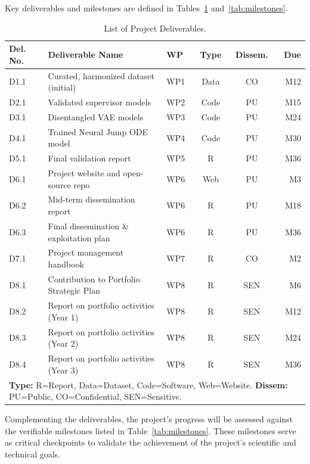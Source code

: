 \documentclass[11pt, a4paper]{article}
\begin{document}
Key deliverables and milestones are defined in Tables~\ref{tab:deliverables} and~\ref{tab:milestones}.

\begin{table}[H]
    \centering
    \caption{List of Project Deliverables.}
    \label{tab:deliverables}
    \small
    \begin{tabular}{lp{5.5cm}lccr}
        \toprule
        \textbf{Del. No.} & \textbf{Deliverable Name} & \textbf{WP} & \textbf{Type} & \textbf{Dissem.} & \textbf{Due} \\
        \midrule
        D1.1 & Curated, harmonized dataset (initial) & WP1 & Data & CO & M12 \\
        D2.1 & Validated supervisor models & WP2 & Code & PU & M15 \\
        D3.1 & Disentangled VAE models & WP3 & Code & PU & M24 \\
        D4.1 & Trained Neural Jump ODE model & WP4 & Code & PU & M30 \\
        D5.1 & Final validation report & WP5 & R & PU & M36 \\
        D6.1 & Project website and open-source repo & WP6 & Web & PU & M3 \\
        D6.2 & Mid-term dissemination report & WP6 & R & PU & M18 \\
        D6.3 & Final dissemination \& exploitation plan & WP6 & R & PU & M36 \\
        D7.1 & Project management handbook & WP7 & R & CO & M2 \\
        D8.1 & Contribution to Portfolio Strategic Plan & WP8 & R & SEN & M6 \\
        D8.2 & Report on portfolio activities (Year 1) & WP8 & R & SEN & M12 \\
        D8.3 & Report on portfolio activities (Year 2) & WP8 & R & SEN & M24 \\
        D8.4 & Report on portfolio activities (Year 3) & WP8 & R & SEN & M36 \\
        \bottomrule
        \multicolumn{6}{p{13cm}}{\footnotesize \textbf{Type:} R=Report, Data=Dataset, Code=Software, Web=Website. \textbf{Dissem:} PU=Public, CO=Confidential, SEN=Sensitive.}
    \end{tabular}
\end{table}

Complementing the deliverables, the project's progress will be assessed against the verifiable milestones listed in Table~\ref{tab:milestones}. These milestones serve as critical checkpoints to validate the achievement of the project's scientific and technical goals.
\end{document}
